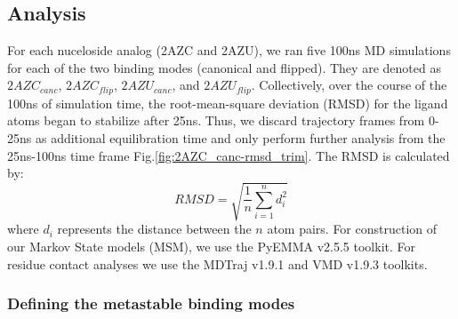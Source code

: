 \subsection{Analysis}
For each nuceloside analog (2AZC and 2AZU), we ran five 100ns MD simulations for each of the two binding modes (canonical and flipped).
They are denoted as $2AZC_{canc}$, $2AZC_{flip}$, $2AZU_{canc}$, and $2AZU_{flip}$.
Collectively, over the course of the 100ns of simulation time, the root-mean-square deviation (RMSD) for the ligand atoms began to stabilize after 25ns.
Thus, we discard trajectory frames from 0-25ns as additional equilibration time and only perform further analysis from the 25ns-100ns time frame Fig.\ref{fig:2AZC_canc-rmsd_trim}.
The RMSD is calculated by:
\begin{equation}
    RMSD = \sqrt{ \frac{1}{n} \sum^{n}_{i=1}{d_{i}^{2}}}
\end{equation}
where $d_{i}$ represents the distance between the $n$ atom pairs.
For construction of our Markov State models (MSM), we use the PyEMMA v2.5.5 \cite{scherer2015pyemma} toolkit.
For residue contact analyses we use the MDTraj v1.9.1 \cite{mcgibbon2015mdtraj} and VMD v1.9.3 \cite{humphrey1996vmd} toolkits.

\subsubsection*{Defining the metastable binding modes}

